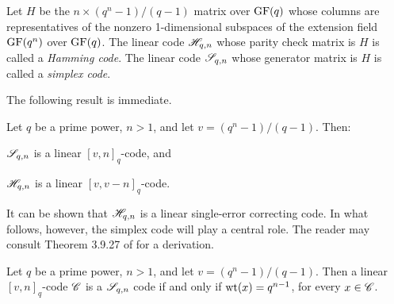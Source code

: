 \documentclass[../../../main]{subfiles}
\begin{document}
\begin{defin}\label{hamming-code}\label{hamming-simplex-def}
  Let $H$ be the $n \times (q^n-1)/(q-1)$ matrix over $\text{GF}(q)$ whose columns are representatives of the nonzero 1-dimensional subspaces of the extension field $\text{GF}(q^n)$ over $\text{GF}(q)$. The linear code $\mathscr{H}_{q,n}$ whose parity check matrix is $H$ is called a {\it Hamming code}. The linear code $\mathscr{S}_{q,n}$ whose generator matrix is $H$ is called a {\it simplex code}.
\end{defin}

The following result is immediate.

\begin{prop}
  Let $q$ be a prime power, $n > 1$, and let $v=(q^n-1)/(q-1)$. Then:
  \begin{defenum}
  \item $\mathscr{S}_{q,n}$ is a linear $[v,n]_q$-code, and
  \item $\mathscr{H}_{q,n}$ is a linear $[v,v-n]_q$-code.
  \end{defenum}
\end{prop}

It can be shown that $\mathscr{H}_{q,n}$ is a linear
single-error correcting code. In what follows, however, the simplex code will
play a central role. The reader may consult Theorem 3.9.27 of
\cite{combinatorics-of-symmetric-designs} for a derivation.

\begin{thm}\label{simplex-properties}
  Let $q$ be a prime power, $n>1$, and let $v=(q^n-1)/(q-1)$. Then a linear $[v,n]_q$-code $\mathscr{C}$ is a $\mathscr{S}_{q,n}$ code if and only if $\text{wt}(x)=q^{n-1}$, for every $x \in \mathscr{C}$.
\end{thm}

\biblio
\end{document}
